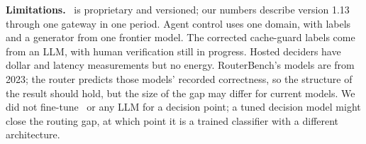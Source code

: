 \textbf{Limitations.}
\jev\ is proprietary and versioned; our numbers describe version 1.13 through one gateway in one period.
Agent control uses one domain, with labels and a generator from one frontier model.
The corrected cache-guard labels come from an LLM, with human verification still in progress.
Hosted deciders have dollar and latency measurements but no energy.
RouterBench's models are from 2023; the router predicts those models' recorded correctness, so the structure of the result should hold, but the size of the gap may differ for current models.
We did not fine-tune \kev\ or any LLM for a decision point; a tuned decision model might close the routing gap, at which point it is a trained classifier with a different architecture.
